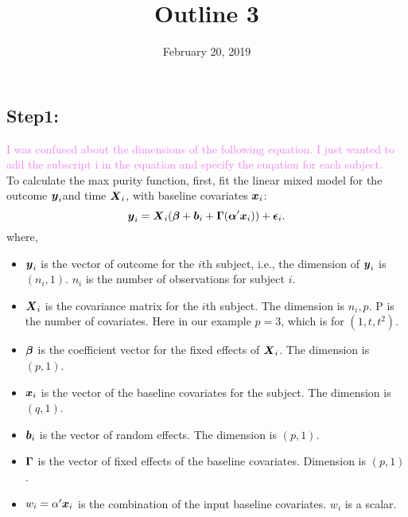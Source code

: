 \documentclass[12pt]{article}
\newcommand{\kate}[1]{{\textcolor{violet}{#1}}}
\begin{document}
\title{Outline 3}
\date{February 20, 2019} \maketitle
\subsection{Step1: }

\kate{I was confused about the dimensions of the following equation. I just wanted to add the subscript i in the equation and specify the euqation for each subject.} 
\\
To calculate the max purity function, first,  
fit the linear mixed model for the outcome $\mbox{\boldmath $y$}_i$and time $\mbox{\boldmath $X$}_i$, with baseline covariates $\mbox{\boldmath $x$}_i$:  
$$\mbox{\boldmath $y$}_i = \mbox{\boldmath $X$}_i(\mbox{\boldmath $\beta$} +\mbox{\boldmath $b$}_i +\mbox{\boldmath $\Gamma$}(\mbox{\boldmath $\alpha$}'\mbox{\boldmath $x$}_i)) + \mbox{\boldmath $\epsilon$}_i.$$
where,

\begin{itemize}
    \item $\mbox{\boldmath $y$}_i$ is the vector of outcome for the $i$th subject, i.e., the dimension of $\mbox{\boldmath $y$}_i$ is $(n_i, 1)$. $n_i$ is the number of observations for subject $i$.
    \item $\mbox{\boldmath $X$}_i$ is the covariance matrix for the $i$th subject. The dimension is $n_i, p$. P is the number of covariates. Here in our example $p = 3$, which is for $(1, t, t^2)$.
    \item $\mbox{\boldmath $\beta$}$ is the coefficient vector for the fixed effects of $\mbox{\boldmath $X$}_i$. The dimension is $(p,1)$.
    \item $\mbox{\boldmath $x$}_i$ is the vector of the baseline covariates for the subject. The dimension is $(q,1)$.
    \item $\mbox{\boldmath $b$}_i$ is the vector of random effects. The dimension is $(p,1).$
    \item $\mbox{\boldmath $\Gamma$}$ is the vector of fixed effects of the baseline covariates. Dimension is $(p,1)$.
    \item $w_i = \alpha'\mbox{\boldmath $x$}_i$ is the combination of the input baseline covariates. $w_i$ is a scalar. 
\end{itemize}
\end{document}

